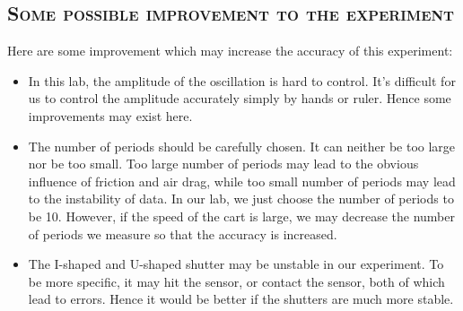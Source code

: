 \documentclass[a4paper,12pt]{article}
\begin{document}
\subsection{\textsc{Some possible improvement to the experiment}}
Here are some improvement which may increase the accuracy of this experiment:
\begin{itemize}
\item In this lab, the amplitude of the oscillation is hard to control. It's difficult for us to control the amplitude accurately simply by hands or ruler. Hence some improvements may exist here.
\item The number of periods should be carefully chosen. It can neither be too large nor be too small. Too large number of periods may lead to the obvious influence of friction and air drag, while too small number of periods may lead to the instability of data. In our lab, we just choose the number of periods to be 10. However, if the speed of the cart is large, we may decrease the number of periods we measure so that the accuracy is increased.
\item The I-shaped and U-shaped shutter may be unstable in our experiment. To be more specific, it may hit the sensor, or contact the sensor, both of which lead to errors. Hence it would be better if the shutters are much more stable.
\end{itemize}
\end{document}
